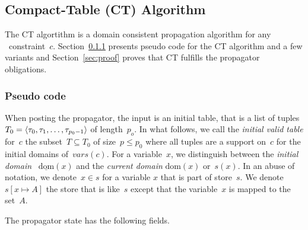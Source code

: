 \documentclass[a4paper,11pt]{article}
\newcommand{\Secref}[1]{Section~\ref{#1}}
\newcommand{\Table}{\Constraint{Table}}
\newcommand{\Dom}[1]{\text{dom}({#1})}
\newcommand{\Dominit}[1]{\underline{\text{dom}}(#1)}
\numberwithin{equation}{section}
\begin{document}
\subsection{Compact-Table (CT) Algorithm}
\label{sec:ct}
The CT algortithm is a domain consistent propagation
algorithm for any \Table~constraint~$c$. \Secref{ct:pseudo}
presents pseudo code for the CT algorithm and a few variants
and \Secref{sec:proof} proves that CT fulfills the propagator
obligations.

\subsubsection{Pseudo code}
\label{ct:pseudo}

When posting the propagator, the input is an initial table, that is
a list of tuples $T_0 = \left\langle\tau_0, \tau_1, \ldots, \tau_{p_0-1}\right\rangle$ of
length~$p_o$. In what follows, we call the \emph{initial valid table}
for~$c$ the subset~$T \subseteq T_0$ of size~$p \leq p_0$ where all
tuples are a support on~$c$ for the initial domains of~$vars(c)$.
For a variable~$x$, we distinguish between the \emph{initial domain}
~$\Dominit{x}$ and the \emph{current domain} $\Dom{x}$ or~$s(x)$.
In an abuse of notation, we denote~$x \in s$ for a variable
$x$ that is part of store~$s$. We denote~$s[x \mapsto A]$
the store that is like~$s$ except that the variable~$x$ is mapped
to the set~$A$.

The propagator state has the following fields.
\end{document}
